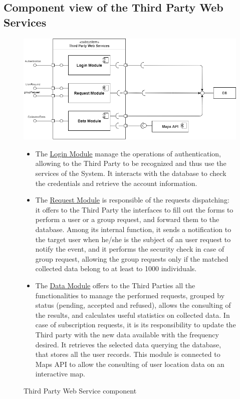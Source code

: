 \subsection{Component view of the Third Party Web Services}
\begin{figure}[H]
    \centering
    \includegraphics[scale=0.5]{DD/Pictures/ThirdPartyServiceDiagram(1).png}
    \caption{Third Party Web Service component}
    

\begin{itemize}
\item  The \underline{Login Module} manage the operations of authentication, allowing to the Third Party to be recognized and thus use the services of the System. It interacts with the database to check the credentials and retrieve the account information.

    \item The \underline{Request Module} is responsible of
    the requests dispatching: it offers to the Third Party the interfaces to fill out the forms to perform a user or a group request, and  forward them to the database. Among its internal function, it sends a notification to the target user when he/she is the subject of an user request to notify the event, and it performs the security check in case of group request, allowing the group requests only if the matched collected data belong to at least to 1000 individuals.
    
    \item The \underline{Data Module}  offers to the Third Parties all the functionalities to manage the performed requests, grouped by status (pending, accepted and refused), allows the consulting of the results, and calculates useful statistics on collected data. In case of subscription requests, it is its responsibility to update the Third party with the new data available with the frequency desired. It retrieves the selected data querying the database, that stores all the user records.
    This module is connected to Maps API to allow the consulting of user location data on an interactive map.
    
    
   \end{itemize} 
   
    
\end{figure}
